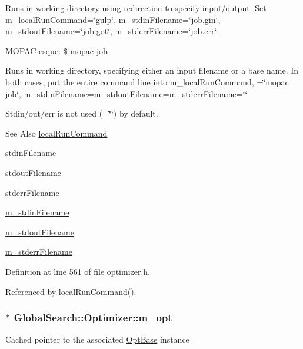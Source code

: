 Runs in working directory using redirection to specify input/output. Set m\-\_\-local\-Run\-Command=\char`\"{}gulp\char`\"{}, m\-\_\-stdin\-Filename=\char`\"{}job.\-gin\char`\"{}, m\-\_\-stdout\-Filename=\char`\"{}job.\-got\char`\"{}, m\-\_\-stderr\-Filename=\char`\"{}job.\-err\char`\"{}.

M\-O\-P\-A\-C-\/esque\-: \$ mopac job

Runs in working directory, specifying either an input filename or a base name. In both cases, put the entire command line into m\-\_\-local\-Run\-Command, =\char`\"{}mopac job\char`\"{}, m\-\_\-stdin\-Filename=m\-\_\-stdout\-Filename=m\-\_\-stderr\-Filename=\char`\"{}\char`\"{}

Stdin/out/err is not used (=\char`\"{}\char`\"{}) by default.

\begin{DoxySeeAlso}{See Also}
\hyperlink{classGlobalSearch_1_1Optimizer_aed5eb285d45a001c9520c2ed3a5b57a1}{local\-Run\-Command} 

\hyperlink{classGlobalSearch_1_1Optimizer_a5964a9b38d3ae90c8ac36a75d3a35832}{stdin\-Filename} 

\hyperlink{classGlobalSearch_1_1Optimizer_a217750aa50431f9948aa8164fb99de0c}{stdout\-Filename} 

\hyperlink{classGlobalSearch_1_1Optimizer_acaa83cc6bf1dcc263b92450b4f8cb652}{stderr\-Filename} 

\hyperlink{classGlobalSearch_1_1Optimizer_aca91d12d7aecae052d6ab5ae158acec6}{m\-\_\-stdin\-Filename} 

\hyperlink{classGlobalSearch_1_1Optimizer_a5ed04fdd5f8b511249e408adcd174550}{m\-\_\-stdout\-Filename} 

\hyperlink{classGlobalSearch_1_1Optimizer_a75b800a7f90a03d551f6795404d0c8f1}{m\-\_\-stderr\-Filename} 
\end{DoxySeeAlso}


Definition at line 561 of file optimizer.\-h.



Referenced by local\-Run\-Command().

\hypertarget{classGlobalSearch_1_1Optimizer_a689df6e2c0d8bbfff99585ca54199696}{
\subsubsection[{m\-\_\-opt}]{$\ast$ Global\-Search\-::\-Optimizer\-::m\-\_\-opt\hspace{0.3cm}{\ttfamily [protected]}}}\label{classGlobalSearch_1_1Optimizer_a689df6e2c0d8bbfff99585ca54199696}
Cached pointer to the associated \hyperlink{classGlobalSearch_1_1OptBase}{Opt\-Base} instance 


